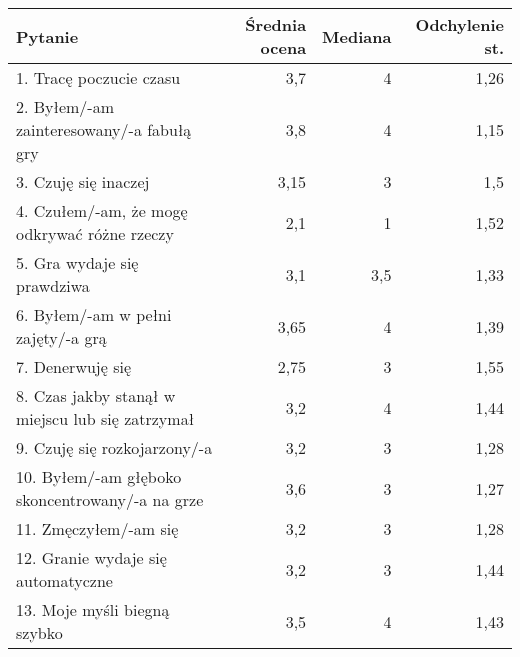\begin{table}[h!]
    \begin{center}
        \begin{tabular}{|m{10em}|r|r|r|}
            \hline
            Pytanie                                                           & Średnia ocena & Mediana & Odchylenie st. \\
            \hline
            1. Tracę poczucie czasu                                           & 3,7           & 4       & 1,26           \\
            2. Byłem/-am \newline zainteresowany/-a fabułą gry                & 3,8           & 4       & 1,15           \\
            3. Czuję się inaczej                                              & 3,15          & 3       & 1,5            \\
            4. Czułem/-am, że mogę odkrywać różne rzeczy                      & 2,1           & 1       & 1,52           \\
            5. Gra wydaje się prawdziwa                                       & 3,1           & 3,5     & 1,33           \\
            6. Byłem/-am \newline w pełni zajęty/-a grą                       & 3,65          & 4       & 1,39           \\
            7. Denerwuję się                                                  & 2,75          & 3       & 1,55           \\
            8. Czas jakby stanął w miejscu lub się zatrzymał                  & 3,2           & 4       & 1,44           \\
            9. Czuję się \newline rozkojarzony/-a                             & 3,2           & 3       & 1,28           \\
            10. Byłem/-am głęboko \newline skoncentrowany/-a \newline na grze & 3,6           & 3       & 1,27           \\
            11. Zmęczyłem/-am się                                             & 3,2           & 3       & 1,28           \\
            12. Granie wydaje się automatyczne                                & 3,2           & 3       & 1,44           \\
            13. Moje myśli \newline biegną szybko                             & 3,5           & 4       & 1,43           \\

\end{tabular}
\end{center}
\end{table}

